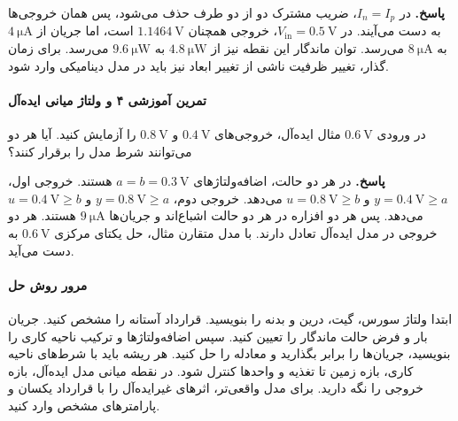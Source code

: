 \textbf{پاسخ.}
در \(I_n=I_p\)، ضریب مشترک دو از دو طرف حذف می‌شود، پس همان
خروجی‌ها به دست می‌آیند. در \(V_{\mathrm{in}}=\qty{0.5}{\volt}\)،
خروجی همچنان \(\qty{1.1464}{\volt}\) است، اما جریان از
\(\qty{4}{\micro\ampere}\) به \(\qty{8}{\micro\ampere}\)
می‌رسد. توان ماندگار این نقطه نیز از
\(\qty{4.8}{\micro\watt}\) به \(\qty{9.6}{\micro\watt}\)
می‌رسد. برای زمان گذار، تغییر ظرفیت ناشی از تغییر ابعاد نیز باید
در مدل دینامیکی وارد شود.

\paragraph*{تمرین آموزشی ۴ و ولتاژ میانی ایده‌آل}
در ورودی \(\qty{0.6}{\volt}\) مثال ایده‌آل، خروجی‌های
\(\qty{0.4}{\volt}\) و \(\qty{0.8}{\volt}\) را آزمایش کنید.
آیا هر دو می‌توانند شرط  مدل را برقرار کنند؟

\textbf{پاسخ.}
در هر دو حالت، اضافه‌ولتاژهای \(a=b=\qty{0.3}{\volt}\)
هستند. خروجی اول، \(y=\qty{0.4}{\volt}\ge a\) و
\(u=\qty{0.8}{\volt}\ge b\) می‌دهد. خروجی دوم،
\(y=\qty{0.8}{\volt}\ge a\) و
\(u=\qty{0.4}{\volt}\ge b\) می‌دهد.
پس هر دو افزاره در هر دو حالت اشباع‌اند و جریان‌ها
\(\qty{9}{\micro\ampere}\) هستند. هر دو خروجی در مدل ایده‌آل
تعادل دارند. با مدل  متقارن مثال، حل یکتای مرکزی
\(\qty{0.6}{\volt}\) به دست می‌آید.

\paragraph*{مرور روش حل}
ابتدا ولتاژ سورس، گیت، درین و بدنه را بنویسید. قرارداد آستانه
 را مشخص کنید. جریان بار و فرض حالت ماندگار را تعیین
کنید. سپس اضافه‌ولتاژها و ترکیب ناحیه کاری را بنویسید، جریان‌ها
را برابر بگذارید و معادله را حل کنید. هر ریشه باید با شرط‌های
ناحیه کاری، بازه زمین تا تغذیه و واحدها کنترل شود. در نقطه میانی
مدل ایده‌آل، بازه خروجی را نگه دارید. برای مدل واقعی‌تر، اثرهای
غیرایده‌آل را با قرارداد یکسان و پارامترهای مشخص وارد کنید.
